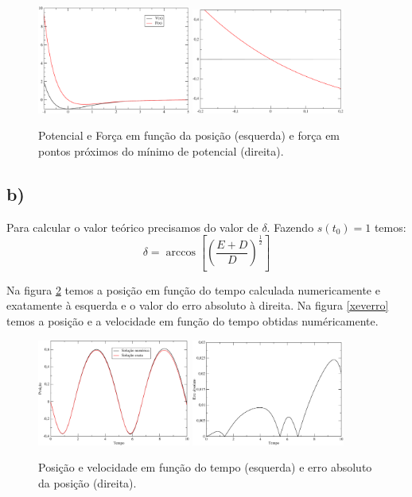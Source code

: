 \documentclass[a4wide]{report}
\begin{document}
\begin{figure}[!t]
\centering
\includegraphics[width=0.447\textwidth]{potential.pdf}
\includegraphics[width=0.447\textwidth]{zoom.pdf}
\caption{Potencial e Força em função da posição (esquerda) e força em pontos próximos do mínimo de potencial (direita).}
\label{VeF}
\end{figure}

\subsection*{b)}

Para calcular o valor teórico precisamos do valor de $\delta$. Fazendo $s(t_0) = 1$ temos:
\begin{equation*}
\delta =  \arccos \left[ \left(\frac{E+D}{D} \right)^\frac{1}{2} \right]  
\end{equation*}
\label{F}

Na figura \ref{xev} temos a posição em função do tempo calculada numericamente e exatamente à esquerda e o valor do erro absoluto à direita. Na figura \ref{xeverro} temos a posição e a velocidade em função do tempo obtidas numéricamente.

\begin{figure}[!htb]
\centering
\includegraphics[width=0.447\textwidth]{exata.pdf}
\includegraphics[width=0.447\textwidth]{3erro.pdf}
\caption{Posição e velocidade em função do tempo (esquerda) e erro absoluto da posição (direita).}
\label{xev}
\end{figure}
\end{document}
